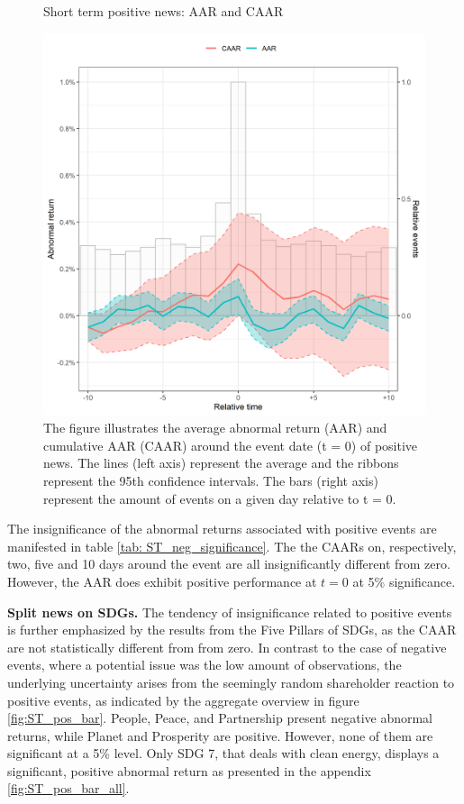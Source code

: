 \begin{figure} [H] 
    \centering
    \caption{Short term positive news: AAR and CAAR}
    \includegraphics[scale=0.6]{Projekt/1.Figures analysis/ST_positive_all_CI.png}
    \caption*{\footnotesize The figure illustrates the average abnormal return (AAR) and cumulative AAR (CAAR) around the event date (t = 0) of positive news. The lines (left axis) represent the average and the ribbons represent the 95th confidence intervals. The bars (right axis) represent the amount of events on a given day relative to t = 0. }
    \label{fig:ST_pos_news}
\end{figure}

The insignificance of the abnormal returns associated with positive events are manifested in table \ref{tab: ST_neg_significance}. The the CAARs on, respectively, two, five and 10 days around the event are all insignificantly different from zero. However, the AAR does exhibit positive performance at $t = 0$ at 5\% significance.


\textbf{Split news on SDGs.}
The tendency of insignificance related to positive events is further emphasized by the results from the Five Pillars of SDGs, as the CAAR are not statistically different from from zero. In contrast to the case of negative events, where a potential issue was the low amount of observations, the underlying uncertainty arises from the seemingly random shareholder reaction to positive events, as indicated by the aggregate overview in figure \ref{fig:ST_pos_bar}. People, Peace, and Partnership present negative abnormal returns, while Planet and Prosperity are positive. However, none of them are significant at a 5\% level. Only SDG 7, that deals with clean energy, displays a significant, positive abnormal return as presented in the appendix \ref{fig:ST_pos_bar_all}. 

